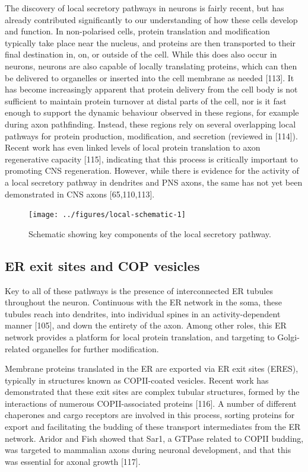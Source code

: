 \documentclass[
  12pt,
  a4paper,
]{book}
\begin{document}
The discovery of local secretory pathways in neurons is fairly recent, but has already contributed significantly to our understanding of how these cells develop and function. In non-polarised cells, protein translation and modification typically take place near the nucleus, and proteins are then transported to their final destination in, on, or outside of the cell. While this does also occur in neurons, neurons are also capable of locally translating proteins, which can then be delivered to organelles or inserted into the cell membrane as needed {[}113{]}. It has become increasingly apparent that protein delivery from the cell body is not sufficient to maintain protein turnover at distal parts of the cell, nor is it fast enough to support the dynamic behaviour observed in these regions, for example during axon pathfinding. Instead, these regions rely on several overlapping local pathways for protein production, modification, and secretion (reviewed in {[}114{]}). Recent work has even linked levels of local protein translation to axon regenerative capacity {[}115{]}, indicating that this process is critically important to promoting CNS regeneration. However, while there is evidence for the activity of a local secretory pathway in dendrites and PNS axons, the same has not yet been demonstrated in CNS axons {[}65,110,113{]}.

\begin{figure}
\texttt{[image: ../figures/local-schematic-1]} \caption[Schematic of the local secretory pathway]{Schematic showing key components of the local secretory pathway.}\label{fig:local-schematic}
\end{figure}

\hypertarget{er-exit-sites-and-cop-vesicles}{%
\subsection{ER exit sites and COP vesicles}\label{er-exit-sites-and-cop-vesicles}}

Key to all of these pathways is the presence of interconnected ER tubules throughout the neuron. Continuous with the ER network in the soma, these tubules reach into dendrites, into individual spines in an activity-dependent manner {[}105{]}, and down the entirety of the axon. Among other roles, this ER network provides a platform for local protein translation, and targeting to Golgi-related organelles for further modification.

Membrane proteins translated in the ER are exported via ER exit sites (ERES), typically in structures known as COPII-coated vesicles. Recent work has demonstrated that these exit sites are complex tubular structures, formed by the interactions of numerous COPII-associated proteins {[}116{]}. A number of different chaperones and cargo receptors are involved in this process, sorting proteins for export and facilitating the budding of these transport intermediates from the ER network. Aridor and Fish showed that Sar1, a GTPase related to COPII budding, was targeted to mammalian axons during neuronal development, and that this was essential for axonal growth {[}117{]}.
\end{document}
